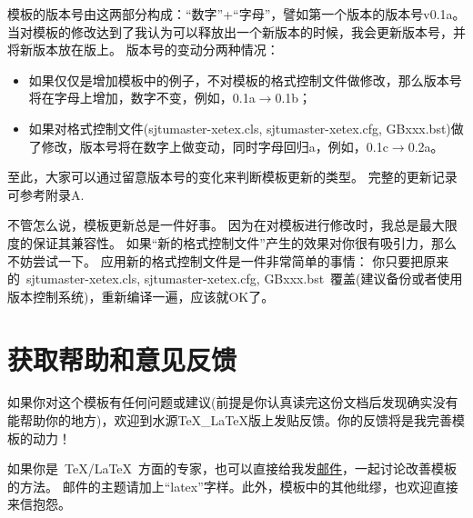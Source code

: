 模板的版本号由这两部分构成：``数字''+``字母''，譬如第一个版本的版本号v0.1a。
当对模板的修改达到了我认为可以释放出一个新版本的时候，我会更新版本号，并将新版本放在版上。
版本号的变动分两种情况：

\begin{itemize}
\item 如果仅仅是增加模板中的例子，不对模板的格式控制文件做修改，那么版本号将在字母上增加，数字不变，例如，0.1a$\rightarrow$0.1b；
\item 如果对格式控制文件(sjtumaster-xetex.cls, sjtumaster-xetex.cfg, GBxxx.bst)做了修改，版本号将在数字上做变动，同时字母回归a，例如，0.1c$\rightarrow$0.2a。
\end{itemize}

至此，大家可以通过留意版本号的变化来判断模板更新的类型。
完整的更新记录可参考附录A.

不管怎么说，模板更新总是一件好事。
因为在对模板进行修改时，我总是最大限度的保证其兼容性。
如果``新的格式控制文件''产生的效果对你很有吸引力，那么不妨尝试一下。
应用新的格式控制文件是一件非常简单的事情：
你只要把原来的~sjtumaster-xetex.cls, sjtumaster-xetex.cfg, GBxxx.bst~覆盖(建议备份或者使用版本控制系统)，重新编译一遍，应该就OK了。


\section{获取帮助和意见反馈}
\label{sec:replay}

如果你对这个模板有任何问题或建议(前提是你认真读完这份文档后发现确实没有能帮助你的地方)，欢迎到水源TeX\_LaTeX版上发贴反馈。你的反馈将是我完善模板的动力！

如果你是~\TeX/\LaTeX~方面的专家，也可以直接给我发\href{mailto:wei.jianwen@gmail.com}{邮件}，一起讨论改善模板的方法。
邮件的主题请加上``latex''字样。此外，模板中的其他纰缪，也欢迎直接来信抱怨。
